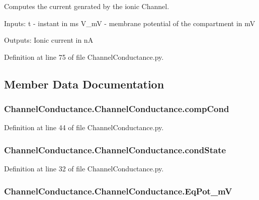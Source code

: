 Computes the current genrated by the ionic Channel. 

Inputs\-: t -\/ instant in ms V\-\_\-m\-V -\/ membrane potential of the compartment in m\-V

Outputs\-: Ionic current in n\-A 

Definition at line 75 of file Channel\-Conductance.\-py.



\subsection{Member Data Documentation}
\hypertarget{class_channel_conductance_1_1_channel_conductance_a0a91eec3fa2b1dfc66c6379943a5907f}{
\subsubsection[{comp\-Cond}]{\setlength{\rightskip}{0pt plus 5cm}Channel\-Conductance.\-Channel\-Conductance.\-comp\-Cond}}\label{class_channel_conductance_1_1_channel_conductance_a0a91eec3fa2b1dfc66c6379943a5907f}


Definition at line 44 of file Channel\-Conductance.\-py.

\hypertarget{class_channel_conductance_1_1_channel_conductance_a628553cbc1efd93b30b0a15afd4417d9}{
\subsubsection[{cond\-State}]{\setlength{\rightskip}{0pt plus 5cm}Channel\-Conductance.\-Channel\-Conductance.\-cond\-State}}\label{class_channel_conductance_1_1_channel_conductance_a628553cbc1efd93b30b0a15afd4417d9}


Definition at line 32 of file Channel\-Conductance.\-py.

\hypertarget{class_channel_conductance_1_1_channel_conductance_a654a73b6cd5853b509e7f7fba060572b}{
\subsubsection[{Eq\-Pot\-\_\-m\-V}]{\setlength{\rightskip}{0pt plus 5cm}Channel\-Conductance.\-Channel\-Conductance.\-Eq\-Pot\-\_\-m\-V}}\label{class_channel_conductance_1_1_channel_conductance_a654a73b6cd5853b509e7f7fba060572b}


